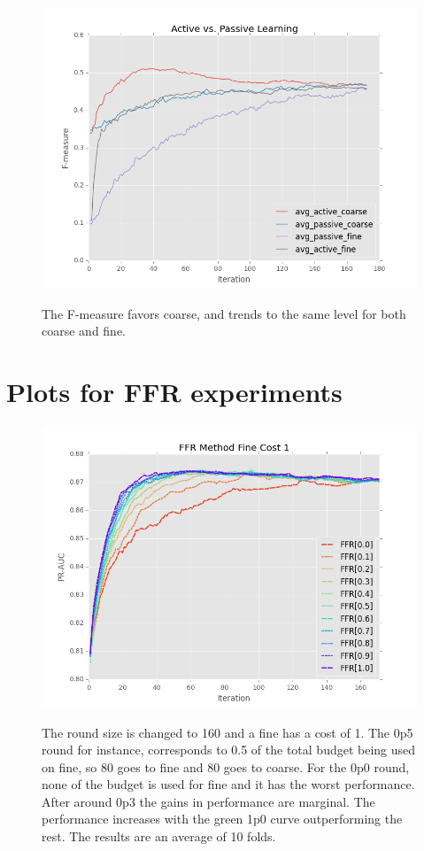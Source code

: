 \documentclass[ms]{nuthesis}
\begin{document}
\FloatBarrier
\begin{figure}[!htb]
	\centering
    \includegraphics[width=1.0\columnwidth]{fig/ActiveVsPassiveF1SVM}
    \label{fig:ActiveVsPassiveF1SVM}
    \caption{The F-measure favors coarse, and trends to the same level
    for both coarse and fine.}
\end{figure}
\FloatBarrier


\FloatBarrier
\section{Plots for FFR experiments}
\begin{figure}[!htb]
	\centering
    \includegraphics[width=1.0\columnwidth]{fig/FFR_PR_Cost1_rnds0_171}
    \label{fig:FFR_PR_Cost1}
    \caption{The round size is changed to 160 and a fine has a cost of 1.
The 0p5 round for instance, corresponds to 0.5 of the total budget being used on fine,
so 80 goes to fine and 80 goes to coarse. For the 0p0 round, none of the budget is
used for fine and it has the worst performance. After around 0p3 the gains in performance
are marginal. The performance increases with the green 1p0 curve outperforming the
rest. The results are an average of 10 folds.}
\end{figure}
\FloatBarrier
\end{document}
